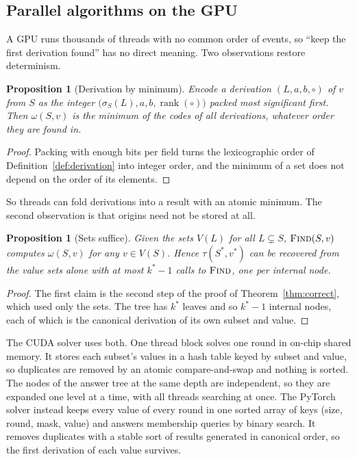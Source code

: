 \documentclass[11pt,a4paper]{article}
\newtheorem{proposition}[theorem]{Proposition}
\theoremstyle{definition}
\theoremstyle{remark}
\newcommand{\proc}[1]{\textnormal{\textsc{#1}}}
\begin{document}
\subsection{Parallel algorithms on the GPU}\label{sec:gpu}

A GPU runs thousands of threads with no common order of events, so ``keep the first derivation found''
has no direct meaning. Two observations restore determinism.

\begin{proposition}[Derivation by minimum]\label{prop:min}
Encode a derivation $(L, a, b, \circ)$ of $v$ from $S$ as the integer
$\bigl(\sigma_S(L), a, b, \operatorname{rank}(\circ)\bigr)$ packed most significant first. Then
$\omega(S, v)$ is the minimum of the codes of all derivations, whatever order they are found in.
\end{proposition}

\begin{proof}
Packing with enough bits per field turns the lexicographic order of Definition~\ref{def:derivation} into
integer order, and the minimum of a set does not depend on the order of its elements.
\end{proof}

So threads can fold derivations into a result with an atomic minimum. The second observation is that
origins need not be stored at all.

\begin{proposition}[Sets suffice]\label{prop:sets}
Given the sets $V(L)$ for all $L \subsetneq S$, $\proc{Find}(S, v)$ computes $\omega(S, v)$ for any $v \in V(S)$.
Hence $\tau(S^*, v^*)$ can be recovered from the value sets alone with at most $k^* - 1$ calls to
$\proc{Find}$, one per internal node.
\end{proposition}

\begin{proof}
The first claim is the second step of the proof of Theorem~\ref{thm:correct}, which used only the sets. The tree
has $k^*$ leaves and so $k^* - 1$ internal nodes, each of which is the canonical derivation of its own subset
and value.
\end{proof}

The CUDA solver uses both. One thread block solves one round in on-chip shared memory. It stores each
subset's values in a hash table keyed by subset and value, so duplicates are removed by an atomic
compare-and-swap and nothing is sorted. The nodes of the answer tree at the same depth are independent,
so they are expanded one level at a time, with all threads searching at once. The PyTorch solver instead
keeps every value of every round in one sorted array of keys (size, round, mask, value) and answers
membership queries by binary search. It removes duplicates with a stable sort of results generated in
canonical order, so the first derivation of each value survives.
\end{document}

